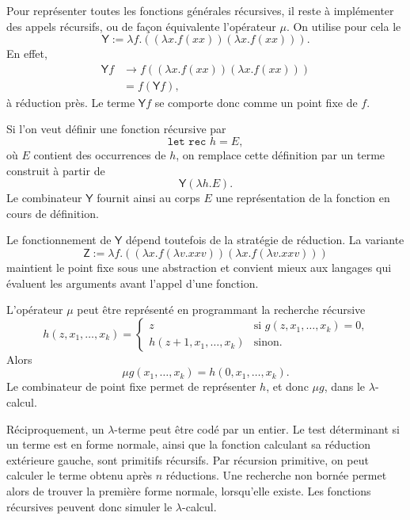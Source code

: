
\thingy Pour représenter toutes les fonctions générales récursives, il
reste à implémenter des appels récursifs, ou de façon équivalente
l'opérateur $\mu$.  On utilise pour cela le
\[
\mathsf{Y}
 :=\lambda f.((\lambda x.f(xx))(\lambda x.f(xx))).
\]
En effet,
\[
\begin{aligned}
\mathsf{Y}f
 &\longrightarrow
 f((\lambda x.f(xx))(\lambda x.f(xx)))\\
 &=f(\mathsf{Y}f),
\end{aligned}
\]
à réduction près.  Le terme $\mathsf{Y}f$ se comporte donc comme un
point fixe de $f$.

Si l'on veut définir une fonction récursive par
\[
\texttt{let rec }h=E,
\]
où $E$ contient des occurrences de $h$, on remplace cette définition
par un terme construit à partir de
\[
\mathsf{Y}(\lambda h.E).
\]
Le combinateur $\mathsf{Y}$ fournit ainsi au corps $E$ une
représentation de la fonction en cours de définition.

Le fonctionnement de $\mathsf{Y}$ dépend toutefois de la stratégie de
réduction.  La variante
\[
\mathsf{Z}
 :=\lambda f.
 ((\lambda x.f(\lambda v.xxv))
  (\lambda x.f(\lambda v.xxv)))
\]
maintient le point fixe sous une abstraction et convient mieux aux
langages qui évaluent les arguments avant l'appel d'une fonction.

\thingy L'opérateur $\mu$ peut être représenté en programmant la
recherche récursive
\[
h(z,x_1,\ldots,x_k)=
\begin{cases}
z&\text{si $g(z,x_1,\ldots,x_k)=0$,}\\
h(z+1,x_1,\ldots,x_k)
 &\text{sinon.}
\end{cases}
\]
Alors
\[
\mu g(x_1,\ldots,x_k)=h(0,x_1,\ldots,x_k).
\]
Le combinateur de point fixe permet de représenter $h$, et donc
$\mu g$, dans le $\lambda$-calcul.

Réciproquement, un $\lambda$-terme peut être codé par un entier.  Le
test déterminant si un terme est en forme normale, ainsi que la
fonction calculant sa réduction extérieure gauche, sont primitifs
récursifs.  Par récursion primitive, on peut calculer le terme obtenu
après $n$ réductions.  Une recherche non bornée permet alors de trouver
la première forme normale, lorsqu'elle existe.  Les fonctions
récursives peuvent donc simuler le $\lambda$-calcul.

